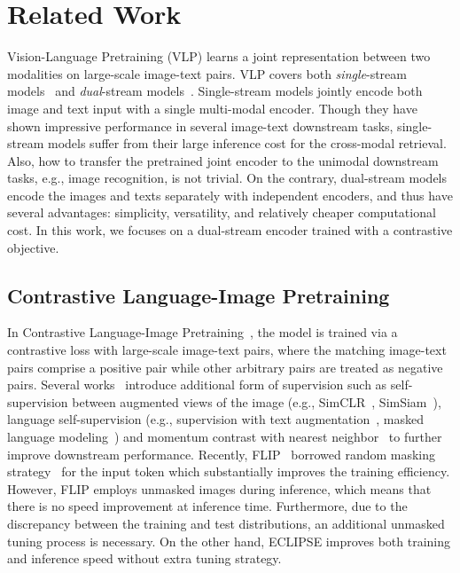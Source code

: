 \section{Related Work}
Vision-Language Pretraining (VLP) learns a joint representation between two modalities on large-scale image-text pairs.
VLP covers both \textit{single}-stream models~\cite{li2019visualbert,chen2019uniter,huang2019unicoder,li2020oscar,li2020unimo,lu2019vilbert,tan2019lxmert} and \textit{dual}-stream models~\cite{jia2021scaling,radford2021learning,li2022supervision}.
Single-stream models jointly encode both image and text input with a single multi-modal encoder.
Though they have shown impressive performance in several image-text downstream tasks, single-stream models suffer from their large inference cost for the cross-modal retrieval.
Also, how to transfer the pretrained joint encoder to the unimodal downstream tasks, e.g., image recognition, is not trivial.
On the contrary, dual-stream models encode the images and texts separately with independent encoders, and thus have several advantages: simplicity, versatility, and relatively cheaper computational cost.
In this work, we focuses on a dual-stream encoder trained with a contrastive objective.

\label{sec:related_work}
\subsection{Contrastive Language-Image Pretraining}
In Contrastive Language-Image Pretraining~\cite{jia2021scaling,li2020unimo,radford2021learning}, the model is trained via a contrastive loss with large-scale image-text pairs, where the matching image-text pairs comprise a positive pair while other arbitrary pairs are treated as negative pairs.
Several works~\cite{mu2021slip,li2022supervision} introduce additional form of supervision such as self-supervision between augmented views of the image (e.g., SimCLR~\cite{chen2020simple}, SimSiam~\cite{chen2021exploring}), language self-supervision (e.g., supervision with text augmentation~\cite{wei2019eda}, masked language modeling~\cite{devlin2018bert}) and momentum contrast with nearest neighbor~\cite{he2020moco} to further improve downstream performance.
Recently, FLIP~\cite{li2022scaling} borrowed random masking strategy~\cite{he2022masked} for the input token which substantially improves the training efficiency. 
However, FLIP employs unmasked images during inference, which means that there is no speed improvement at inference time. Furthermore, due to the discrepancy between the training and test distributions, an additional unmasked tuning process is necessary.
On the other hand, ECLIPSE improves both training and inference speed without extra tuning strategy.

